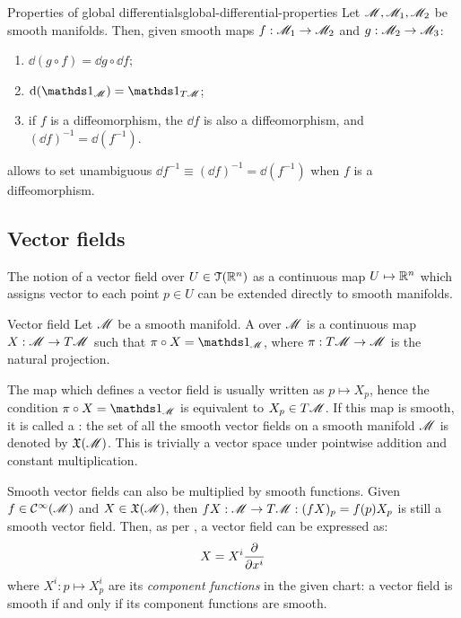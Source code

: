 \begin{lemma}{Properties of global differentials}{global-differential-properties}
  Let $ \mathscr{M} , \mathscr{M}_1 , \mathscr{M}_2 $ be smooth manifolds. Then, given smooth maps $ f : \mathscr{M}_1 \rightarrow \mathscr{M}_2 $ and $ g : \mathscr{M}_2 \rightarrow \mathscr{M}_3 $:
  \begin{enumerate}
    \item \label{item:glob-diff-1} $ \dd (g \circ f) = \dd g \circ \dd f $;
    \item \label{item:glob-diff-2} $ \dd (\id_\man) = \id_{T\man} $;
    \item \label{item:glob-diff-3} if $ f $ is a diffeomorphism, the $ \dd f $ is also a diffeomorphism, and $ (\dd f)^{-1} = \dd (f^{-1}) $.
  \end{enumerate}
\end{lemma}

 allows to set unambiguous $ \dd f^{-1} \equiv (\dd f)^{-1} = \dd (f^{-1}) $ when $ f $ is a diffeomorphism.

\subsection{Vector fields}

The notion of a vector field over $ U \in \EuScript{T}(\mathbb{R}^n) $ as a continuous map $ U \mapsto \mathbb{R}^n $ which assigns vector to each point $ p \in U $ can be extended directly to smooth manifolds.

\begin{definition}{Vector field}{}
  Let $ \mathscr{M} $ be a smooth manifold. A  over $ \mathscr{M} $ is a continuous map $ X : \mathscr{M} \rightarrow T\mathscr{M} $ such that $ \pi \circ X = \id_\man $, where $ \pi : T\mathscr{M} \rightarrow \mathscr{M} $ is the natural projection.
\end{definition}

The map which defines a vector field is usually written as $ p \mapsto X_p $, hence the condition $ \pi \circ X = \id_\man $ is equivalent to $ X_p \in T\mathscr{M} $. If this map is smooth, it is called a : the set of all the smooth vector fields on a smooth manifold $ \mathscr{M} $ is denoted by $ \mathfrak{X}(\mathscr{M}) $. This is trivially a vector space under pointwise addition and constant multiplication.

Smooth vector fields can also be multiplied by smooth functions. Given $ f \in \mathcal{C}^{\infty}(\mathscr{M}) $ and $ X \in \mathfrak{X}(\mathscr{M}) $, then $ fX : \mathscr{M} \rightarrow T\mathscr{M} : (fX)_p = f(p) X_p $ is still a smooth vector field\footnotemark. Then, as per , a vector field can be expressed as:
\begin{equation*}
  X = X^i \frac{\partial}{\partial x^i}
\end{equation*}
where $ X^i : p \mapsto X_p^i $ are its \emph{component functions} in the given chart: a vector field is smooth if and only if its component functions are smooth.

